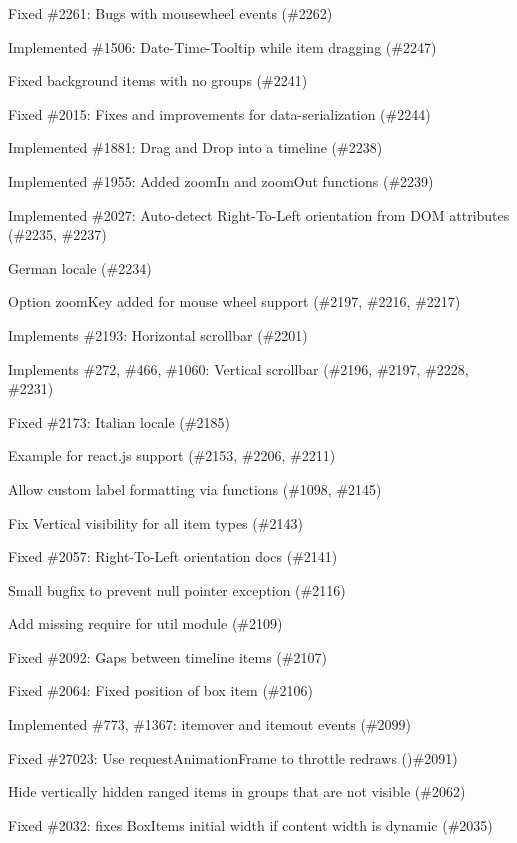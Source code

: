 \begin{DoxyItemize}
\item Fixed \#2261\+: Bugs with mousewheel events (\#2262)
\item Implemented \#1506\+: Date-\/\+Time-\/\+Tooltip while item dragging (\#2247)
\item Fixed background items with no groups (\#2241)
\item Fixed \#2015\+: Fixes and improvements for data-\/serialization (\#2244)
\item Implemented \#1881\+: Drag and Drop into a timeline (\#2238)
\item Implemented \#1955\+: Added zoom\+In and zoom\+Out functions (\#2239)
\item Implemented \#2027\+: Auto-\/detect Right-\/\+To-\/\+Left orientation from D\+OM attributes (\#2235, \#2237)
\item German locale (\#2234)
\item Option {\ttfamily zoom\+Key} added for mouse wheel support (\#2197, \#2216, \#2217)
\item Implements \#2193\+: Horizontal scrollbar (\#2201)
\item Implements \#272, \#466, \#1060\+: Vertical scrollbar (\#2196, \#2197, \#2228, \#2231)
\item Fixed \#2173\+: Italian locale (\#2185)
\item Example for react.\+js support (\#2153, \#2206, \#2211)
\item Allow custom label formatting via functions (\#1098, \#2145)
\item Fix Vertical visibility for all item types (\#2143)
\item Fixed \#2057\+: Right-\/\+To-\/\+Left orientation docs (\#2141)
\item Small bugfix to prevent null pointer exception (\#2116)
\item Add missing require for util module (\#2109)
\item Fixed \#2092\+: Gaps between timeline items (\#2107)
\item Fixed \#2064\+: Fixed position of box item (\#2106)
\item Implemented \#773, \#1367\+: {\ttfamily itemover} and {\ttfamily itemout} events (\#2099)
\item Fixed \#27023\+: Use {\ttfamily request\+Animation\+Frame} to throttle redraws ()\#2091)
\item Hide vertically hidden ranged items in groups that are not visible (\#2062)
\item Fixed \#2032\+: fixes Box\+Item\textquotesingle{}s initial width if content width is dynamic (\#2035)

\end{DoxyItemize}
